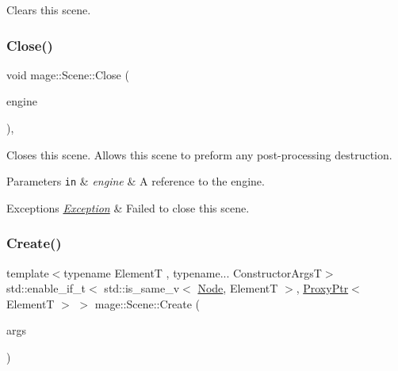 Clears this scene. \mbox{\label{classmage_1_1_scene_a6b90bb51fb3b5e965a42bfa57f992803}} 
\subsubsection{\texorpdfstring{Close()}{Close()}}
{\footnotesize\ttfamily void mage\+::\+Scene\+::\+Close (\begin{DoxyParamCaption}\item[{\mbox{[}\mbox{[}maybe\+\_\+unused\mbox{]} \mbox{]} \mbox{\hyperlink{classmage_1_1_engine}{Engine}} \&}]{engine }\end{DoxyParamCaption})\hspace{0.3cm}{\ttfamily [private]}, {\ttfamily [virtual]}}

Closes this scene. Allows this scene to preform any post-\/processing destruction.


\begin{DoxyParams}[1]{Parameters}
\mbox{\tt in}  & {\em engine} & A reference to the engine. \\
\hline
\end{DoxyParams}

\begin{DoxyExceptions}{Exceptions}
{\em \mbox{\hyperlink{classmage_1_1_exception}{Exception}}} & Failed to close this scene. \\
\hline
\end{DoxyExceptions}
\mbox{\label{classmage_1_1_scene_a8ce3f5152ad4b0935a08cc2f0a53383c}} 
\subsubsection{\texorpdfstring{Create()}{Create()}\hspace{0.1cm}{\footnotesize\ttfamily [1/2]}}
{\footnotesize\ttfamily template$<$typename ElementT , typename... Constructor\+ArgsT$>$ \\
std\+::enable\+\_\+if\+\_\+t$<$ std\+::is\+\_\+same\+\_\+v$<$ \mbox{\hyperlink{classmage_1_1_node}{Node}}, ElementT $>$, \mbox{\hyperlink{classmage_1_1_proxy_ptr}{Proxy\+Ptr}}$<$ ElementT $>$ $>$ mage\+::\+Scene\+::\+Create (\begin{DoxyParamCaption}\item[{Constructor\+ArgsT \&\&...}]{args }\end{DoxyParamCaption})}

